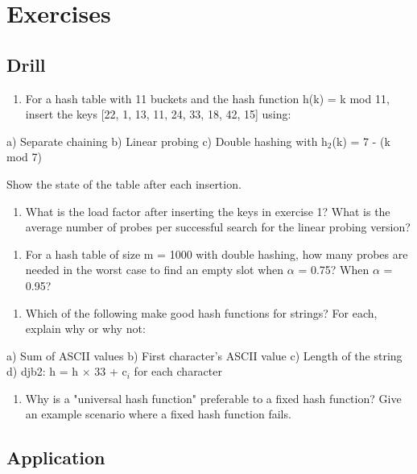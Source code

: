 \section{Exercises}

\subsection{Drill}

\begin{enumerate}
\item For a hash table with 11 buckets and the hash function h(k) = k mod 11, insert the keys [22, 1, 13, 11, 24, 33, 18, 42, 15] using:
\end{enumerate}
   a) Separate chaining
   b) Linear probing
   c) Double hashing with h$_{2}$(k) = 7 - (k mod 7)

   Show the state of the table after each insertion.

\begin{enumerate}
\item What is the load factor after inserting the keys in exercise 1? What is the average number of probes per successful search for the linear probing version?
\end{enumerate}

\begin{enumerate}
\item For a hash table of size m = 1000 with double hashing, how many probes are needed in the worst case to find an empty slot when $\alpha $ = 0.75? When $\alpha $ = 0.95?
\end{enumerate}

\begin{enumerate}
\item Which of the following make good hash functions for strings? For each, explain why or why not:
\end{enumerate}
   a) Sum of ASCII values
   b) First character's ASCII value
   c) Length of the string
   d) djb2: h = h $\times $ 33 + c$_{i}$ for each character

\begin{enumerate}
\item Why is a "universal hash function" preferable to a fixed hash function? Give an example scenario where a fixed hash function fails.
\end{enumerate}

\subsection{Application}

